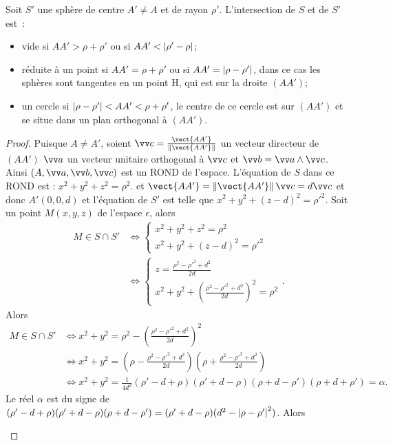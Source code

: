 \begin{prop}
  Soit $S'$ une sphère de centre $A'\neq A$ et de rayon $\rho'$. L'intersection de $S$ et de $S'$ est~:
  \begin{itemize}
  \item vide si $AA'>\rho+\rho'$ ou si $AA'<\left\lvert\rho'-\rho\right\rvert$;
  \item réduite à un point si $AA'=\rho+\rho'$ ou si $AA'=\left\lvert\rho-\rho'\right\rvert$, dans ce cas les sphères sont tangentes en un point H, qui est sur la droite $(AA')$;
  \item un cercle si $\left\lvert\rho-\rho'\right\rvert<AA'<\rho+\rho'$, le centre de ce cercle est sur $(AA')$ et se situe dans un plan orthogonal à $(AA')$.
  \end{itemize}
\end{prop}
\begin{proof}
  Puisque $A\neq A'$, soient $\vc=\frac{\vect{AA'}}{\norme{\vect{AA'}}}$ un vecteur directeur de $(AA')$ $\va$ un vecteur unitaire orthogonal à $\vc$ et $\vb=\va\wedge\vc$. Ainsi $(A,\va,\vb,\vc)$ est un ROND de l'espace. L'équation de $S$ dans ce ROND est : $x^2+y^2+z^2=\rho^2$. et $\vect{AA'}=\norme{\vect{AA'}}\vc=d\vc$ et donc $A'(0,0,d)$ et l'équation de $S'$ est telle que $x^2+y^2+(z-d)^2=\rho'^2$. Soit un point $M(x,y,z)$ de l'espace $\epsilon$, alors
  \begin{align}
    M \in S\cap S' &\iff \begin{cases} x^2+y^2+z^2=\rho^2 \\ x^2+y^2+(z-d)^2=\rho'^2 \end{cases} \\
    &\iff \begin{cases} z = \frac{\rho^2-\rho'^2+d^2}{2d}\\ x^2+y^2+\left(\frac{\rho^2-\rho'^2+d^2}{2d}\right)^2=\rho^2 \end{cases}.
  \end{align}
  Alors
  \begin{align} 
    M \in S\cap S' &\iff x^2+y^2=\rho^2-\left(\frac{\rho^2-\rho'^2+d^2}{2d}\right)^2\\
    &\iff x^2+y^2=\left(\rho-\frac{\rho^2-\rho'^2+d^2}{2d}\right)\left(\rho+\frac{\rho^2-\rho'^2+d^2}{2d}\right)\\
    &\iff x^2+y^2=\frac{1}{4d^2}(\rho'-d+\rho)(\rho'+d-\rho)(\rho+d-\rho')(\rho+d+\rho')=\alpha.
  \end{align}
  Le réel $\alpha$ est du signe de $(\rho'-d+\rho)(\rho'+d-\rho)(\rho+d-\rho')=(\rho'+d-\rho)(d^2-\left\lvert\rho-\rho'\right\rvert^2)$. Alors
  \begin{itemize}

\end{itemize}
\end{proof}
